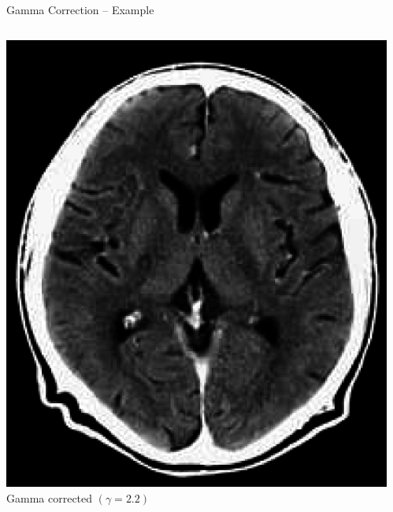 \begin{frame}[c]{Gamma Correction -- Example}
    \begin{columns}[onlytextwidth]
        \begin{column}{0.30\textwidth}\centering
            \includegraphics[width=\textwidth]{img/brain_gamma0}\\ Gamma
            corrected $(\gamma=2.2)$
        \end{column}
        \begin{column}{0.30\textwidth}\centering

\end{column}
\end{columns}
\end{frame}
